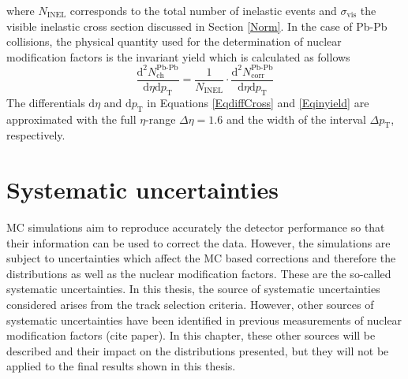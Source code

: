 \documentclass[12pt,a4paper]{report}
\begin{document}
where $N_\text{INEL}$ corresponds to the total number of inelastic events and $\sigma_\text{vis}$ the visible inelastic cross section discussed in Section \ref{Norm}. In the case of Pb-Pb collisions, the physical quantity used for the determination of nuclear modification factors is the invariant yield which is calculated as follows
\begin{equation}
\label{Eqinyield}
\dfrac{\text{d}^2 N^\text{Pb-Pb}_\text{ch}}{\text{d}\eta \text{d}p_\text{T}} = \dfrac{1}{N_\text{INEL}} \cdot \dfrac{\text{d}^2 N^\text{Pb-Pb}_\text{corr}}{\text{d}\eta \text{d}p_\text{T}}
\end{equation}
The differentials $\text{d}\eta$ and $\text{d}p_\text{T}$ in Equations \ref{EqdiffCross} and \ref{Eqinyield} are approximated with the full $\eta$-range $\Delta \eta = 1.6$ and the width of the \pt interval $\Delta p_\text{T}$, respectively.
\section{Systematic uncertainties}
MC simulations aim to reproduce accurately the detector performance so that their information can be used to correct the data. However, the simulations are subject to uncertainties which affect the MC based corrections and therefore the \pt distributions as well as the nuclear modification factors. These are the so-called systematic uncertainties. In this thesis, the source of systematic uncertainties considered arises from the track selection criteria. However, other sources of systematic uncertainties have been identified in previous measurements of nuclear modification factors (cite paper). In this chapter, these other sources will be described and their impact on the \pt distributions presented, but they will not be applied to the final results shown in this thesis.
\end{document}
